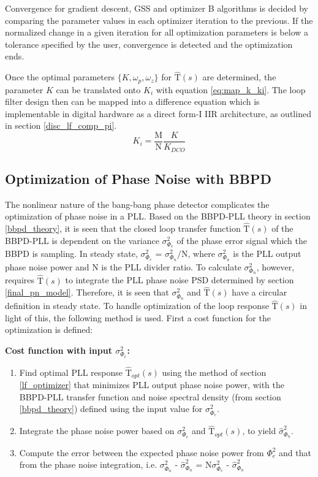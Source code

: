 Convergence for gradient descent, GSS and optimizer B algorithms is decided by comparing the parameter values in each optimizer iteration to the previous. If the normalized change in a given iteration for all optimization parameters is below a tolerance specified by the user, convergence is detected and the optimization ends. 

Once the optimal parameters $\{K, \omega_p, \omega_z\}$ for $\mathrm{\hat{T}}(s)$ are determined, the parameter $K$ can be translated onto $K_i$ with equation \ref{eq:map_k_ki}. The loop filter design then can be mapped into a difference equation which is implementable in digital hardware as a direct form-I IIR architecture, as outlined in section \ref{disc_lf_comp_pi}.
\begin{equation}\label{eq:map_k_ki}
K_i=\frac{\mathrm{M}}{\mathrm{N}}\frac{K}{K_{DCO}}
\end{equation}

\subsection{Optimization of Phase Noise with BBPD}
The nonlinear nature of the bang-bang phase detector complicates the optimization of phase noise in a PLL. Based on the BBPD-PLL theory in section \ref{bbpd_theory}, it is seen that the closed loop transfer function $\hat{\mathrm{T}}(s)$ of the BBPD-PLL is dependent on the variance $\sigma^2_{\Phi_e}$ of the phase error signal which the BBPD is sampling. In steady state, $\sigma^2_{\Phi_e}$ = $\sigma^2_{\Phi_n}/\mathrm{N}$, where $\sigma^2_{\Phi_n}$ is the PLL output phase noise power and N is the PLL divider ratio. To calculate $\sigma^2_{\Phi_n}$, however, requires $\hat{\mathrm{T}}(s)$ to integrate the PLL phase noise PSD determined by section \ref{final_pn_model}. Therefore, it is seen that $\sigma^2_{\Phi_n}$ and $\hat{\mathrm{T}}(s)$ have a circular definition in steady state. To handle optimization of the loop response $\hat{\mathrm{T}}(s)$ in light of this, the following method is used. First a cost function for the optimization is defined:

\textbf{Cost function with input $\sigma^2_{\Phi_e}$:}
	\begin{enumerate}[itemsep=0pt,label=\protect\mycirc{\alph*}]
		\setlength\itemsep{-0.8em}
		\item Find optimal PLL response $\hat{\mathrm{T}}_{opt}(s)$ using the method of section \ref{lf_optimizer} that minimizes PLL output phase noise power, with the BBPD-PLL transfer function and noise spectral density (from section \ref{bbpd_theory}) defined using the input value for $\sigma^2_{\Phi_e}$.
		\item Integrate the phase noise power based on $\sigma^2_{\Phi_e}$ and $\hat{\mathrm{T}}_{opt}(s)$, to yield $\hat{\sigma}^2_{\Phi_n}$.
		\item Compute the error between the expected phase noise power from $\Phi^2_e$ and that from the phase noise integration, i.e. $\sigma^2_{\Phi_n}$ - $\hat{\sigma}^2_{\Phi_n}$ = $\mathrm{N}\sigma^2_{\Phi_e}$ - $\hat{\sigma}^2_{\Phi_n}$
	\end{enumerate}

